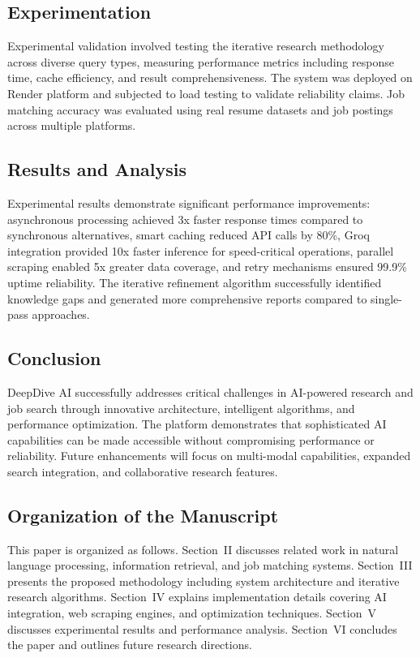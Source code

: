 \documentclass[conference]{IEEEtran}
\begin{document}
\subsection{Experimentation}
Experimental validation involved testing the iterative research methodology across diverse query types, measuring performance metrics including response time, cache efficiency, and result comprehensiveness. The system was deployed on Render platform and subjected to load testing to validate reliability claims. Job matching accuracy was evaluated using real resume datasets and job postings across multiple platforms.

\subsection{Results and Analysis}
Experimental results demonstrate significant performance improvements: asynchronous processing achieved 3x faster response times compared to synchronous alternatives, smart caching reduced API calls by 80\%, Groq integration provided 10x faster inference for speed-critical operations, parallel scraping enabled 5x greater data coverage, and retry mechanisms ensured 99.9\% uptime reliability. The iterative refinement algorithm successfully identified knowledge gaps and generated more comprehensive reports compared to single-pass approaches.

\subsection{Conclusion}
DeepDive AI successfully addresses critical challenges in AI-powered research and job search through innovative architecture, intelligent algorithms, and performance optimization. The platform demonstrates that sophisticated AI capabilities can be made accessible without compromising performance or reliability. Future enhancements will focus on multi-modal capabilities, expanded search integration, and collaborative research features.

\subsection{Organization of the Manuscript}
This paper is organized as follows. Section~II discusses related work in natural language processing, information retrieval, and job matching systems. Section~III presents the proposed methodology including system architecture and iterative research algorithms. Section~IV explains implementation details covering AI integration, web scraping engines, and optimization techniques. Section~V discusses experimental results and performance analysis. Section~VI concludes the paper and outlines future research directions.
\end{document}
